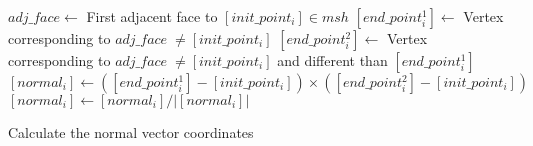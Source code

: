 \pagebreak

\begin{algorithm}[!ht]
\SetAlgoLined
{}

$adj\_face\longleftarrow$ First adjacent face to $[init\_point_i]\in msh$\;
$[end\_point^1_i]\longleftarrow$ Vertex corresponding to $adj\_face\;\neq [init\_point_i]$\;
$[end\_point^2_i]\longleftarrow$ Vertex corresponding to $adj\_face\;\neq [init\_point_i]$ and different than $[end\_point^1_i]$\;
$[normal_i]\longleftarrow ([end\_point^1_i] - [init\_point_i])\times([end\_point^2_i] - [init\_point_i])$\;
$[normal_i]\longleftarrow [normal_i]/\big|[normal_i]\big|$\;
\caption{Calculate the normal vector coordinates}
\label{alg:electrode_orientation}
\end{algorithm}